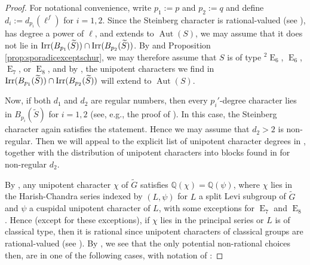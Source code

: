 \documentclass[12pt,leqno,a4paper]{amsart}
\newcommand{\Q}{{\mathbb{Q}}}
\newcommand{\tw}[1]{{}^#1\!}
\def\irr#1{{\rm Irr}(#1)}
\theoremstyle{remark}
\newcommand\wt[1]{\widetilde{#1}}
\newcommand{\aut}{\operatorname{Aut}}
\newcommand\type[1]{\operatorname{#1}}
\begin{document}
\begin{proof}
For notational convenience, write $p_1:=p$ and $p_2:=q$ and define $d_i:=d_{p_i}(\ell^f)$ for $i=1,2$.  Since the Steinberg character is rational-valued (see \cite{lusztig02}), has degree a power of $\ell$, and extends to $\aut(S)$, we may assume that it does not lie in $\irr{B_{p_1}(\wt{S})} \cap  \irr{B_{p_2}(\wt{S})}$.  By \cite[Main Theorem]{Hiss08} and Proposition \ref{prop:sporadicexceptschur}, we may therefore assume that $S$ is of type  $\tw{2}\type{E}_6$, $\type{E}_6$, $\type{E}_7$, or $\type{E}_8$, and by \cite[Theorems 2.4-2.5]{Malle08}, the unipotent characters we find in $\irr{B_{p_1}(\wt{S})} \cap  \irr{B_{p_2}(\wt{S})}$ will extend to $\aut(S)$.

 Now, if both $d_1$ and $d_2$ %
are regular numbers, then every $p_i'$-degree character lies in $B_{p_i}(\wt{S})$ for $i=1,2$ (see, e.g., the proof of \cite[Lemma 3.6]{RSV21}). In this case, the Steinberg character again satisfies the statement. Hence we may assume that $d_2>2$ is non-regular.  Then we will appeal to the explicit list of unipotent character degrees in \cite[Section 13.9]{carter}, together with the distribution of unipotent characters into blocks found in \cite[Tables 1 \& 2]{BMM93} for non-regular $d_2$.




By \cite[Proposition 5.6]{geck03}, any unipotent character $\chi$ of $\wt{G}$ satisfies $\Q(\chi)=\Q(\psi)$, where $\chi$ lies in the Harish-Chandra series indexed by $(L, \psi)$ for $L$ a split Levi subgroup of $\wt{G}$ and $\psi$ a cuspidal unipotent character of $L$, with some exceptions for $\type{E}_7$ and $\type{E}_8$.  Hence (except for these exceptions), if $\chi$ lies in the principal series or $L$ is of classical type, then it is rational since unipotent characters of classical groups are rational-valued (see \cite{lusztig02}).  By \cite[Tables 1 \& 2]{BMM93}, we see that the only potential non-rational choices then, are in one of the following cases, with notation of \cite{carter}:


\end{proof}
\end{document}
